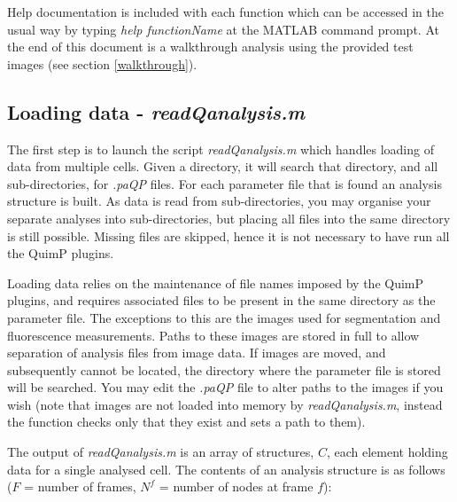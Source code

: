 \documentclass[a4paper,12pt]{article}
\begin{document}
Help documentation is included with each function which can be accessed in the
usual way by typing \textit{help functionName} at
the MATLAB command prompt.  At the end of this document is a walkthrough analysis using the provided test images
(see section \ref{walkthrough}).

\subsection{Loading data - \textit{readQanalysis.m}  }

The first step is to launch the script \textit{readQanalysis.m} which handles loading of data from multiple
cells.  Given a directory, it will search that directory, and all sub-directories, for \textit{.paQP} files. For each parameter file
that is found an analysis structure is built.  As data is read from sub-directories, you may organise your separate analyses into 
sub-directories, but placing all files into the same directory is still possible. Missing files are skipped, hence it is not necessary
to have run all the QuimP plugins.


Loading data relies on the maintenance
of file names imposed by the QuimP plugins, and requires associated files to
be present in the same directory as the parameter file.
The exceptions to this are the images used for segmentation and fluorescence measurements.  Paths to these images are
stored in full to allow separation of analysis files from image data.  If images are moved, and subsequently cannot
be located, the directory where the parameter file is stored will be searched.  You may edit the \textit{.paQP} file to alter
paths to the images if you wish
(note that images are not loaded into memory by \textit{readQanalysis.m}, instead the function checks only that they exist
and sets a path to them).

The output of \textit{readQanalysis.m} is an array of structures, $C$, each element holding data for a single analysed cell.
The contents of an analysis structure is as follows ($F$ = number of frames, $N^{f}$ = number of nodes at frame $f$):
\end{document}
